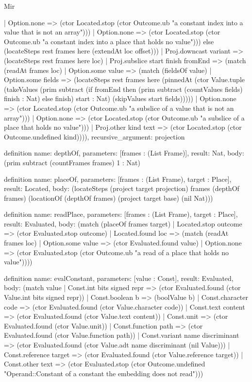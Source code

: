 \begin{lexlean}{Mir}
\begin{semanticmodule}
{          | Option.none => (ctor Located.stop (ctor Outcome.ub "a constant index into a value that is not an array")))
        | Option.none => (ctor Located.stop (ctor Outcome.ub "a constant index into a place that holds no value"))) else (locateSteps rest frames here (extendAt loc offset)))
      | Proj.downcast variant => (locateSteps rest frames here loc)
      | Proj.subslice start finish fromEnd => (match (readAt frames loc)
        | Option.some value => (match (fieldsOf value)
          | Option.some fields => (locateSteps rest frames here (pinnedAt (ctor Value.tuple (takeValues (prim subtract (if fromEnd then (prim subtract (countValues fields) finish : Nat) else finish) start : Nat) (skipValues start fields)))))
          | Option.none => (ctor Located.stop (ctor Outcome.ub "a subslice of a value that is not an array")))
        | Option.none => (ctor Located.stop (ctor Outcome.ub "a subslice of a place that holds no value")))
      | Proj.other kind text => (ctor Located.stop (ctor Outcome.undefined kind)))),
  recursive_argument: projection
}

definition{
  name: depthOf,
  parameters: [frames : (List Frame)],
  result: Nat,
  body: (prim subtract (countFrames frames) 1 : Nat)
}

definition{
  name: placeOf,
  parameters: [frames : (List Frame), target : Place],
  result: Located,
  body: (locateSteps (project target projection) frames (depthOf frames) (locationOf (depthOf frames) (project target base) (nil Nat)))
}

definition{
  name: readPlace,
  parameters: [frames : (List Frame), target : Place],
  result: Evaluated,
  body: (match (placeOf frames target)
    | Located.stop outcome => (ctor Evaluated.stop outcome)
    | Located.found loc => (match (readAt frames loc)
      | Option.some value => (ctor Evaluated.found value)
      | Option.none => (ctor Evaluated.stop (ctor Outcome.ub "a read of a place that holds no value"))))
}

definition{
  name: evalConstant,
  parameters: [value : Const],
  result: Evaluated,
  body: (match value
    | Const.int bits signed repr => (ctor Evaluated.found (ctor Value.int bits signed repr))
    | Const.boolean b => (boolValue b)
    | Const.character code => (ctor Evaluated.found (ctor Value.character code))
    | Const.text content => (ctor Evaluated.found (ctor Value.text content))
    | Const.unit => (ctor Evaluated.found (ctor Value.unit))
    | Const.function path => (ctor Evaluated.found (ctor Value.function path))
    | Const.variant name discriminant => (ctor Evaluated.found (ctor Value.adt name discriminant (nil Value)))
    | Const.reference target => (ctor Evaluated.found (ctor Value.reference target))
    | Const.other text => (ctor Evaluated.stop (ctor Outcome.undefined "Operand::Constant of a constant the embedding does not read")))
}


\end{semanticmodule}
\end{lexlean}

